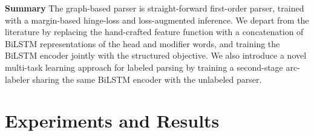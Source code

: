 \documentclass[11pt]{article}
\begin{document}
\noindent\textbf{Summary}
The graph-based parser is straight-forward first-order parser, trained with a
margin-based hinge-loss and loss-augmented inference. 
We depart from the literature by replacing the hand-crafted feature function
with a concatenation of \mbox{BiLSTM} representations of the head and modifier words,
and training the \mbox{BiLSTM} encoder jointly with the structured objective.
We also introduce a novel multi-task learning approach for labeled parsing by training a second-stage arc-labeler sharing the same \mbox{BiLSTM} encoder with the unlabeled
parser.



\section{Experiments and Results}
\label{sec:results}
\end{document}
